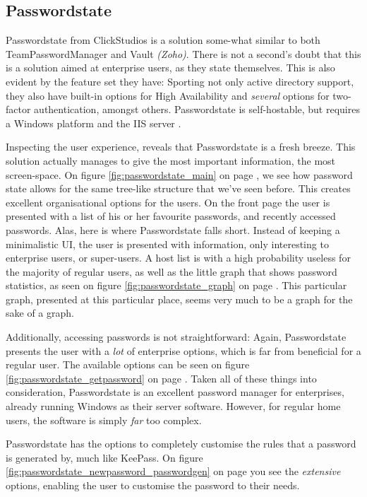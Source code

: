 		\subsection*{Passwordstate}
			Passwordstate from ClickStudios\cite{passwordstate} is a solution some-what similar to both TeamPasswordManager and Vault \emph{(Zoho)}. There is not a second's doubt that this is a solution aimed at enterprise users, as they state themselves. This is also evident by the feature set they have: Sporting not only active directory support, they also have built-in options for High Availability and \emph{several} options for two-factor authentication, amongst others. Passwordstate is self-hostable, but requires a Windows platform and the IIS server \cite{passwordstate_requirements}.

			Inspecting the user experience, reveals that Passwordstate is a fresh breeze. This solution actually manages to give the most important information, the most screen-space. On figure \ref{fig:passwordstate_main} on page \pageref{fig:passwordstate_main}, we see how password state allows for the same tree-like structure that we've seen before. This creates excellent organisational options for the users. On the front page the user is presented with a list of his or her favourite passwords, and recently accessed passwords. Alas, here is where Passwordstate falls short. Instead of keeping a minimalistic UI, the user is presented with information, only interesting to enterprise users, or super-users. A host list is with a high probability useless for the majority of regular users, as well as the little graph that shows password statistics, as seen on figure \ref{fig:passwordstate_graph} on page \pageref{fig:passwordstate_graph}. This particular graph, presented at this particular place, seems very much to be a graph for the sake of a graph. 

			Additionally, accessing passwords is not straightforward: Again, Passwordstate presents the user with a \emph{lot} of enterprise options, which is far from beneficial for a regular user. The available options can be seen on figure \ref{fig:passwordstate_getpassword} on page \pageref{fig:passwordstate_getpassword}. Taken all of these things into consideration, Passwordstate is an excellent password manager for enterprises, already running Windows as their server software. However, for regular home users, the software is simply \emph{far} too complex.

			Passwordstate has the options to completely customise the rules that a password is generated by, much like KeePass. On figure \ref{fig:passwordstate_newpassword_passwordgen} on page \pageref{fig:passwordstate_newpassword_passwordgen} you see the \emph{extensive} options, enabling the user to customise the password to their needs.

